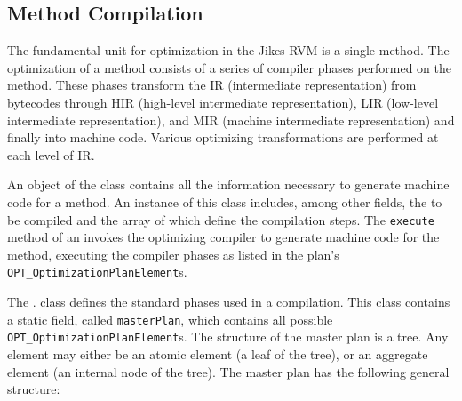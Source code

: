 \subsection{Method Compilation}
\label{sec:optdriver}
The fundamental unit for optimization in the Jikes RVM is a single method. 
The optimization of a method consists of a series of 
compiler phases performed on the method. These 
phases transform the  
IR (intermediate representation) from bytecodes through 
HIR (high-level intermediate representation), 
LIR (low-level intermediate representation), and 
MIR (machine intermediate representation) and finally into machine code. 
Various optimizing transformations are performed at each level of IR.

An object of the class 
contains all the  
information necessary to generate machine code for a method. 
An instance of this class includes, among other fields, 
the 
to be compiled and the array of 
which define the compilation steps.
The {\tt execute} method of an
invokes the optimizing compiler to generate machine code for the method,
executing the compiler phases as listed in the plan's
{\tt OPT\_OptimizationPlanElement}s.

The 
.  
class defines the standard phases used in a compilation.
This class
contains a static field, called {\tt masterPlan}, which contains all
possible {\tt OPT\_OptimizationPlanElement}s.
The structure of the master plan is 
a tree. Any element may either be an atomic element (a leaf of the 
tree), or an aggregate element (an internal node of the tree).
The master plan has the following general structure:

